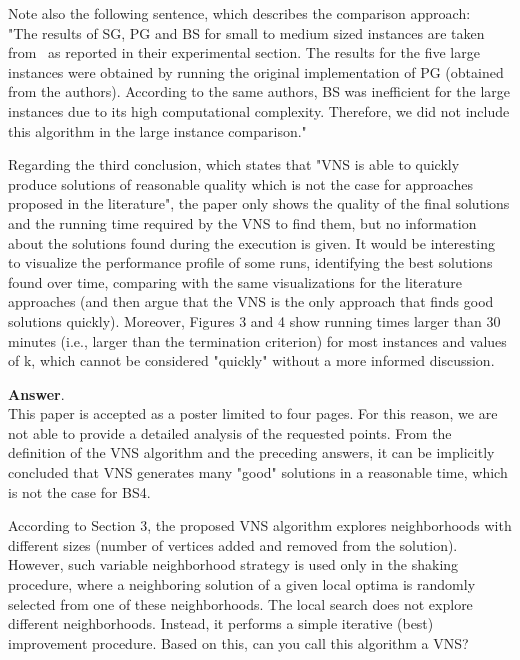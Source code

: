 \documentclass [11pt]{scrartcl}
\begin{document}
\begin{enumerate}
	Note also the following sentence, which describes the comparison approach:\\
	"The results of SG, PG and BS for small to medium sized instances are taken from~\cite{corcoran2021heuristics} as reported in their experimental section. The results for the five large instances were obtained by running the original implementation of PG (obtained from the authors). According to the same authors, BS was inefficient for the large instances due to its high computational complexity. Therefore, we did not include this algorithm in the large instance comparison."
	
	\textbf{Answer}. \\
	This paper is accepted as a poster limited to four pages. For this reason, we are not able to provide a detailed analysis of the requested points. From the definition of the VNS algorithm and the preceding answers, it can be implicitly concluded that VNS generates many "good" solutions in a reasonable time, which is not the case for BS4.
\end{enumerate}

\begin{leftbar}	
According to Section 3, the proposed VNS algorithm explores neighborhoods with different sizes (number of vertices added and removed from the solution). However, such variable neighborhood strategy is used only in the shaking procedure, where a neighboring solution of a given local optima is randomly selected from one of these neighborhoods. The local search does not explore different neighborhoods. Instead, it performs a simple iterative (best) improvement procedure. Based on this, can you call this algorithm a VNS?
\end{leftbar}
\end{document}
